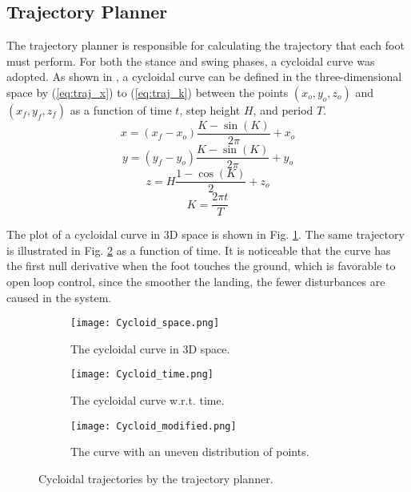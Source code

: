 \documentclass[conference]{IEEEtran}
\begin{document}
\subsection{Trajectory Planner}

The trajectory planner is responsible for calculating the trajectory that each foot must perform. For both the stance and swing phases, a cycloidal curve was adopted. As shown in \cite{Shi2021}, a cycloidal curve can be defined in the three-dimensional space by (\ref{eq:traj_x}) to (\ref{eq:traj_k})
between the points $(x_o, y_o, z_o)$ and $(x_f, y_f, z_f)$ as a function of time $t$, step height $H$, and period $T$.
\begin{equation}
  x = (x_f - x_o) \frac{K - \sin{(K)}}{2 \pi} + x_o
  \label{eq:traj_x}
\end{equation}
\begin{equation}
  y = (y_f - y_o) \frac{K - \sin{(K)}}{2 \pi} + y_o
  \label{eq:traj_y}
\end{equation}
\begin{equation}
  z = H \frac{1 - \cos{(K)}}{2} + z_o
  \label{eq:traj_z}
\end{equation}
\begin{equation}
  K = \frac{2 \pi t}{T}
  \label{eq:traj_k}
\end{equation}

The plot of a cycloidal curve in 3D space is shown in Fig. \ref{fig:traj_space}. The same trajectory is illustrated in Fig. \ref{fig:traj_time} as a function of time. It is noticeable that the curve has the first null derivative when the foot touches the ground, which is favorable to open loop control, since the smoother the landing, the fewer disturbances are caused in the system.

\begin{figure*}[h]
  \centering
  \begin{subfigure}[t]{0.32\textwidth}
    \centering
    \texttt{[image: Cycloid\_space.png]}
    \caption{The cycloidal curve in 3D space.}
    \label{fig:traj_space}
  \end{subfigure}
  \begin{subfigure}[t]{0.32\textwidth}
    \centering
    \texttt{[image: Cycloid\_time.png]}
    \caption{The cycloidal curve w.r.t. time.}
    \label{fig:traj_time}
  \end{subfigure}
  \begin{subfigure}[t]{0.32\textwidth}
    \centering
    \texttt{[image: Cycloid\_modified.png]}
    \caption{The curve with an uneven distribution of points.}
    \label{fig:traj_time_modified}
  \end{subfigure}
  \vfill
  \caption{Cycloidal trajectories by the trajectory planner.}
  \label{fig:traj_curve}
\end{figure*}
\end{document}

